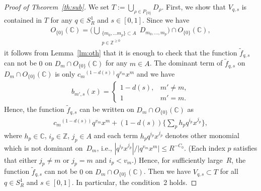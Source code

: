 \documentclass[10pt,a4paper]{amsart}
\numberwithin{equation}{section}
\begin{document}
\begin{proof}[Proof of Theorem~\ref{th:sub}] We set $T:=\bigcup_{\rho \in P_{\{0\}}} D_{\rho}$. First, we show that $V_{q,s}$ is contained in $T$ for any $q \in S_R^1$ and $s \in [0,1]$. Since we have
\begin{gather*}
O_{\{0\}}({\mathbb C}) = \Bigg( \bigcup_{\substack{\{m_0, \dots m_p\} \subset A \\ p \in {\mathbb Z}^{\geq 0}}} D_{m_0, \dots, m_p} \Bigg) \cap O_{\{0\}}({\mathbb C}),
\end{gather*}
it follows from Lemma~\ref{lm:oth} that it is enough to check that the function $\tilde{f}_{q,s}$ can not be $0$ on $D_m \cap O_{\{0\}}({\mathbb C})$ for any $m \in A$.
The dominant term of $\tilde{f}_{q,s}$ on $D_m \cap O_{\{0\}}({\mathbb C})$ is only ${c_{m}}^{(1-d(s))}q^{v_m}x^m$ and we have
\begin{gather*}
b_{m',s}(x) =
\begin{cases}
1-d(s), & m' \neq m, \\
 1 & m' =m.
\end{cases}
\end{gather*}
Hence, the function $\tilde{f}_{q,s}$ can be written on $D_m \cap O_{\{0\}}({\mathbb C})$ as
\begin{gather*}
{c_{m}}^{(1-d(s))}q^{v_m}x^m+(1-d(s)) \bigg\{\sum_{p} h_pq^{i_p}x^{j_p} \bigg\},
\end{gather*}
where $h_p \in {\mathbb C}$, $i_p \in {\mathbb Z}$, $j_p \in A$ and each term $h_pq^{i_p}x^{j_p}$ denotes other monomial which is not dominant on~$D_m$, i.e., $|q^{i_p}x^{j_p}|/|q^{v_m}x^m| \leq R^{-C_0}$. (Each index $p$ satisf\/ies that either $j_p \neq m$ or $j_p = m$ and $i_p < v_m$.) Hence, for suf\/f\/iciently large~$R$, the function $\tilde{f}_{q,s}$ can not be $0$ on $D_m \cap O_{\{0\}}({\mathbb C})$. Then we have $V_{q,s} \subset T$ for all $q \in S_R^1$ and $s \in [0,1]$. In particular, the condition~2 holds.


\end{proof}
\end{document}
